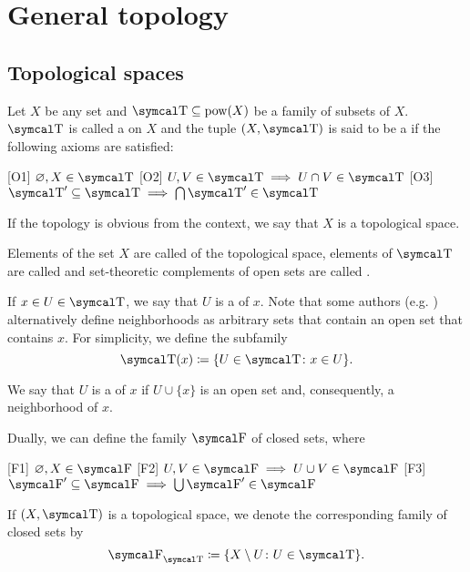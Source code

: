 \section{General topology}\label{sec:general_topology}
\subsection{Topological spaces}\label{subsec:topological_spaces}

\begin{definition}\label{def:topological_space}\cite[11]{Engelking1989}
  Let \( X \) be any set and \( \CT \subseteq \Pow(X) \) be a family of subsets of \( X \). \( \CT \) is called a  on \( X \) and the tuple \( (X, \CT) \) is said to be a  if the following axioms are satisfied:
  \begin{description}
    [O1] \( \varnothing, X \in \CT \)
    [O2] \( U, V \in \CT \implies U \cap V \in \CT \)
    [O3] \( \CT' \subseteq \CT \implies \bigcap \CT' \in \CT \)
  \end{description}

  If the topology is obvious from the context, we say that \( X \) is a topological space.

  Elements of the set \( X \) are called  of the topological space, elements of \( \CT \) are called  and set-theoretic complements of open sets are called .

  If \( x \in U \in \CT \), we say that \( U \) is a  of \( x \). Note that some authors (e.g. \cite[38]{Kelley1955}) alternatively define neighborhoods as arbitrary sets that contain an open set that contains \( x \). For simplicity, we define the subfamily
  \begin{equation*}
    \CT(x) \coloneqq \{ U \in \CT \colon x \in U \}.
  \end{equation*}

  We say that \( U \) is a  of \( x \) if \( U \cup \{ x \} \) is an open set and, consequently, a neighborhood of \( x \).

  Dually, we can define the family \( \CF \) of closed sets, where
  \begin{description}
    [F1] \( \varnothing, X \in \CF \)
    [F2] \( U, V \in \CF \implies U \cup V \in \CF \)
    [F3] \( \CF' \subseteq \CF \implies \bigcup \CF' \in \CF \)
  \end{description}

  If \( (X, \CT) \) is a topological space, we denote the corresponding family of closed sets by
  \begin{equation*}
    \CF_{\CT} \coloneqq \{ X \setminus U \colon U \in \CT \}.
  \end{equation*}
\end{definition}

